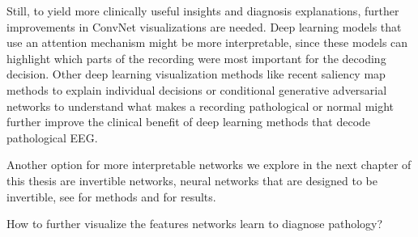 Still, to yield more clinically useful insights and diagnosis
explanations, further improvements in ConvNet visualizations are needed.
Deep learning models that use an attention mechanism might be more
interpretable, since these models can highlight which parts of the
recording were most important for the decoding decision. Other deep
learning visualization methods like recent saliency map methods
\cite{kindermans_patternnet_2017,montavon_methods_2017}
to explain individual decisions or conditional generative adversarial
networks
\cite{mirza_conditional_2014,springenberg_unsupervised_2015}
to understand what makes a recording pathological or normal might
further improve the clinical benefit of deep learning methods that
decode pathological EEG.

Another option for more interpretable networks we explore in the next
chapter of this thesis are invertible networks, neural networks that are
designed to be invertible, see  for
methods and  for results.

\begin{openbox}
\item How to further visualize the features networks learn to diagnose pathology?      
\end{openbox}
    
